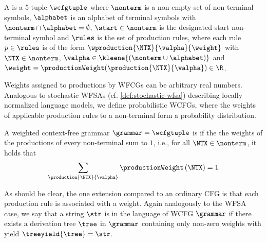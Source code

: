\begin{definition}
A  is a 5-tuple $\wcfgtuple$ where $\nonterm$ is a non-empty set of non-terminal symbols, $\alphabet$ is an alphabet of terminal symbols with $\nonterm \cap \alphabet = \emptyset$, $\start\in\nonterm$ is the designated start non-terminal symbol and $\rules$ is the set of production rules, where each rule $p \in \rules$ is of the form $\wproduction{\NTX}{\valpha}{\weight}$ with $\NTX\in\nonterm$, $\valpha\in\kleene{(\nonterm\cup \alphabet)}$ and $\weight=\productionWeight(\production{\NTX}{\valpha})\in\R$.
\end{definition}

Weights assigned to productions by WFCGs can be arbitrary real numbers.
Analogous to stochastic WFSAs (cf. \cref{def:stochastic-wfsa}) describing locally normalized language models, we define probabilistic WCFGs, where the weights of applicable production rules to a non-terminal form a probability distribution.
\begin{definition}
    A weighted context-free grammar $\grammar = \wcfgtuple$ is  if the the weights of the productions of every non-terminal sum to $1$, i.e., for all $\NTX \in \nonterm$, it holds that 
    \begin{equation}
        \sum_{\production{\NTX}{\valpha}} \productionWeight\left(\NTX\right) = 1
    \end{equation}
\end{definition}

As should be clear, the one extension compared to an ordinary CFG is that each production rule is associated with a weight. 
Again analogously to the WFSA case, we say that a string $\str$ is in the language of WCFG $\grammar$ if there exists a derivation tree $\tree$ in $\grammar$ containing only non-zero weights with yield $\treeyield{\tree}=\str$. 


